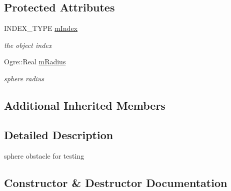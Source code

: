 \subsection*{Protected Attributes}
\begin{DoxyCompactItemize}
\item 
I\+N\+D\+E\+X\+\_\+\+T\+Y\+PE \hyperlink{class_n_c_t_u_1_1_sphere_obstacle_a4855c1addf0ce775a6bd5be08792766c}{m\+Index}\hypertarget{class_n_c_t_u_1_1_sphere_obstacle_a4855c1addf0ce775a6bd5be08792766c}{}\label{class_n_c_t_u_1_1_sphere_obstacle_a4855c1addf0ce775a6bd5be08792766c}

\begin{DoxyCompactList}\small\item\em the object index \end{DoxyCompactList}\item 
Ogre\+::\+Real \hyperlink{class_n_c_t_u_1_1_sphere_obstacle_a57da3759dbbd26ccbd257977fe777e9c}{m\+Radius}\hypertarget{class_n_c_t_u_1_1_sphere_obstacle_a57da3759dbbd26ccbd257977fe777e9c}{}\label{class_n_c_t_u_1_1_sphere_obstacle_a57da3759dbbd26ccbd257977fe777e9c}

\begin{DoxyCompactList}\small\item\em sphere radius \end{DoxyCompactList}\end{DoxyCompactItemize}
\subsection*{Additional Inherited Members}


\subsection{Detailed Description}
sphere obstacle for testing 

\subsection{Constructor \& Destructor Documentation}
